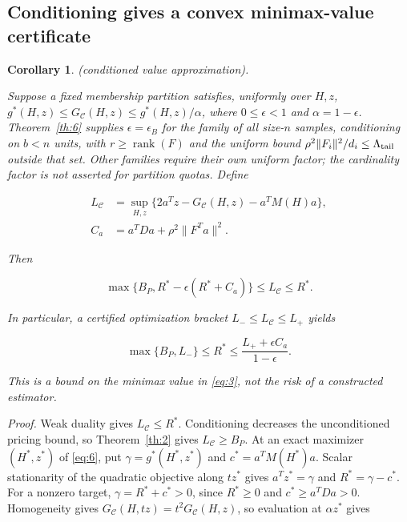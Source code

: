 \documentclass[11pt]{article}
\newtheorem{corollary}[theorem]{Corollary}
\begin{document}
\subsection{Conditioning gives a convex minimax-value
certificate}\label{conditioning-gives-a-convex-minimax-value-certificate}

\begin{corollary}\label{th:7} (conditioned value approximation).

Suppose a fixed membership partition satisfies, uniformly over \(H,z\),
\(g^*(H,z)\le G_{\mathcal C}(H,z)\le g^*(H,z)/\alpha\), where
\(0\le\epsilon<1\) and \(\alpha=1-\epsilon\).
Theorem~\ref{th:6} supplies \(\epsilon=\epsilon_B\) for
the family of all size-\(n\) samples, conditioning on \(b<n\) units,
with \(r\ge\operatorname{rank}(F)\) and the uniform bound
\(\rho^2\|F_i\|^2/d_i\le\Lambda_{\rm tail}\) outside that set. Other
families require their own uniform factor; the cardinality factor is not
asserted for partition quotas. Define

\begin{equation}\label{eq:32}
\begin{aligned}
L_{\mathcal C}&=\sup_{H,z}
\{2a^Tz-G_{\mathcal C}(H,z)-a^TM(H)a\},\\
C_a&=a^TDa+\rho^2\|F^Ta\|^2.
\end{aligned} 
\end{equation}

Then

\begin{equation}\label{eq:33}
\boxed{\max\{B_P,R^*-\epsilon(R^*+C_a)\}
\le L_{\mathcal C}\le R^*.} 
\end{equation}

In particular, a certified optimization bracket
\(L_-\le L_{\mathcal C}\le L_+\) yields

\begin{equation}\label{eq:34}
\boxed{\max\{B_P,L_-\}\le R^*
\le\frac{L_++\epsilon C_a}{1-\epsilon}.} 
\end{equation}

This is a bound on the minimax value in \eqref{eq:3}, not the risk of a
constructed estimator.

\end{corollary}

\emph{Proof.} Weak duality gives \(L_{\mathcal C}\le R^*\). Conditioning
decreases the unconditioned pricing bound, so
Theorem~\ref{th:2} gives \(L_{\mathcal C}\ge B_P\). At
an exact maximizer \((H^*,z^*)\) of \eqref{eq:6}, put
\(\gamma=g^*(H^*,z^*)\) and \(c^*=a^TM(H^*)a\). Scalar stationarity of
the quadratic objective along \(tz^*\) gives \(a^Tz^*=\gamma\) and
\(R^*=\gamma-c^*\). For a nonzero target, \(\gamma=R^*+c^*>0\), since
\(R^*\ge0\) and \(c^*\ge a^TDa>0\). Homogeneity gives
\(G_{\mathcal C}(H,tz)=t^2G_{\mathcal C}(H,z)\), so evaluation at
\(\alpha z^*\) gives
\end{document}
